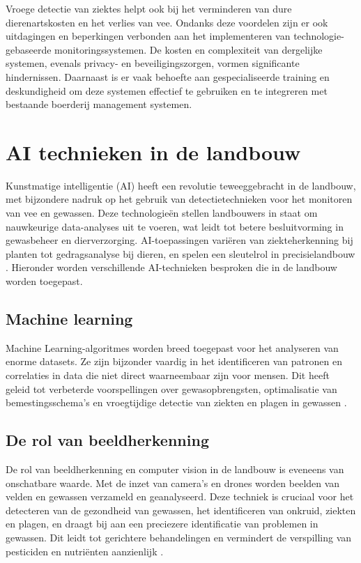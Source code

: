 Vroege detectie van ziektes helpt ook bij het verminderen van dure dierenartskosten en het verlies van vee\autocite{ToAgriculture}\autocite{IntuzIoT}.
\newline
Ondanks deze voordelen zijn er ook uitdagingen en beperkingen verbonden aan het implementeren van technologie-gebaseerde monitoringssystemen. De kosten en complexiteit van dergelijke systemen, evenals privacy- en beveiligingszorgen, vormen significante hindernissen. 
Daarnaast is er vaak behoefte aan gespecialiseerde training en deskundigheid om deze systemen effectief te gebruiken en te integreren met bestaande boerderij management systemen\autocite{ToAgriculture}\autocite{IntuzIoT}.
\newline

\section{AI technieken in de landbouw}
Kunstmatige intelligentie (AI) heeft een revolutie teweeggebracht in de landbouw, met bijzondere nadruk op het gebruik van detectietechnieken voor het monitoren van vee en gewassen. 
Deze technologieën stellen landbouwers in staat om nauwkeurige data-analyses uit te voeren, wat leidt tot betere besluitvorming in gewasbeheer en dierverzorging. AI-toepassingen variëren van ziekteherkenning bij planten tot gedragsanalyse bij dieren, en spelen een sleutelrol in precisielandbouw \autocite{jafar2024revolutionizing}.
Hieronder worden verschillende AI-technieken besproken die in de landbouw worden toegepast.

\subsection{Machine learning}
Machine Learning-algoritmes worden breed toegepast voor het analyseren van enorme datasets. Ze zijn bijzonder vaardig in het identificeren van patronen en correlaties in data die niet direct waarneembaar zijn voor mensen. Dit heeft geleid tot verbeterde voorspellingen over gewasopbrengsten, optimalisatie van bemestingsschema's en vroegtijdige detectie van ziekten en plagen in gewassen \autocite{morota2018machine}.

\subsection{De rol van beeldherkenning}
De rol van beeldherkenning en computer vision in de landbouw is eveneens van onschatbare waarde. Met de inzet van camera's en drones worden beelden van velden en gewassen verzameld en geanalyseerd. Deze techniek is cruciaal voor het detecteren van de gezondheid van gewassen, het identificeren van onkruid, ziekten en plagen, en draagt bij aan een preciezere identificatie van problemen in gewassen. Dit leidt tot gerichtere behandelingen en vermindert de verspilling van pesticiden en nutriënten aanzienlijk \autocite{morota2018big}.

